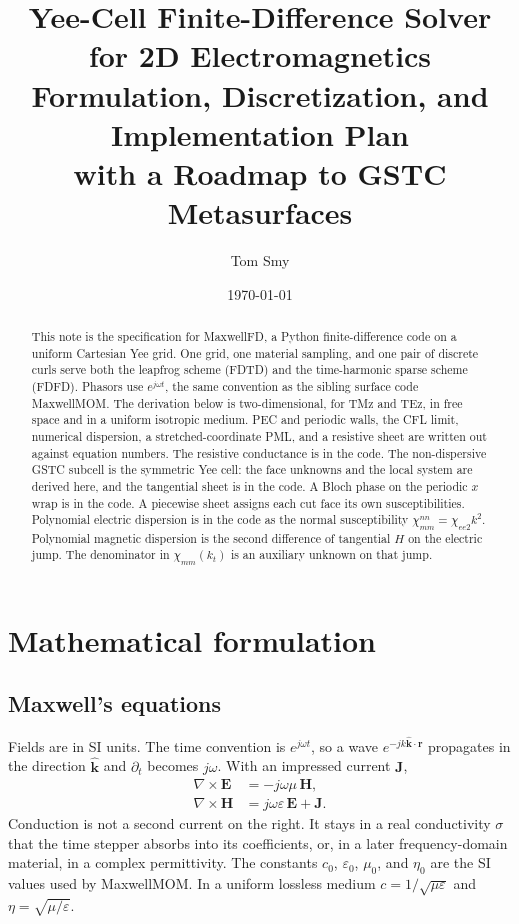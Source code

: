 \documentclass[11pt,a4paper]{article}
\title{\textbf{Yee-Cell Finite-Difference Solver for 2D Electromagnetics}\\[0.4em]
\large Formulation, Discretization, and Implementation Plan\\
with a Roadmap to GSTC Metasurfaces}
\author{Tom Smy}
\date{\today}
\numberwithin{equation}{section}
\begin{document}
\maketitle

\begin{abstract}
This note is the specification for MaxwellFD, a Python finite-difference code
on a uniform Cartesian Yee grid. One grid, one material sampling, and one pair
of discrete curls serve both the leapfrog scheme (FDTD) and the time-harmonic
sparse scheme (FDFD). Phasors use $e^{j\omega t}$, the same convention as the
sibling surface code MaxwellMOM. The derivation below is two-dimensional, for
TMz and TEz, in free space and in a uniform isotropic medium. PEC and periodic
walls, the CFL limit, numerical dispersion, a stretched-coordinate PML, and a
resistive sheet are written out against equation numbers. The resistive
conductance is in the code. The non-dispersive GSTC subcell is the symmetric
Yee cell: the face unknowns and the local system are derived here, and the
tangential sheet is in the code. A Bloch phase on the periodic $x$ wrap
is in the code. A piecewise sheet assigns each cut face its own
susceptibilities. Polynomial electric dispersion is in the code as
the normal susceptibility $\chi_{mm}^{nn}=\chi_{ee2}k^2$. Polynomial
magnetic dispersion is the second difference of tangential $H$ on the
electric jump. The denominator in $\chi_{mm}(k_t)$ is an auxiliary
unknown on that jump.
\end{abstract}

\tableofcontents
\newpage

\section{Mathematical formulation}
\label{sec:formulation}

\subsection{Maxwell's equations}
\label{sec:maxwell}

Fields are in SI units. The time convention is $e^{j\omega t}$, so a wave
$e^{-jk\hat{\mathbf{k}}\cdot\mathbf{r}}$ propagates in the direction
$\hat{\mathbf{k}}$ and $\partial_t$ becomes $j\omega$. With an impressed
current $\mathbf{J}$,
\begin{align}
\nabla\times\mathbf{E} &= -j\omega\mu\,\mathbf{H}, \label{eq:faraday}\\
\nabla\times\mathbf{H} &= j\omega\varepsilon\,\mathbf{E}+\mathbf{J}. \label{eq:ampere}
\end{align}
Conduction is not a second current on the right. It stays in a real
conductivity $\sigma$ that the time stepper absorbs into its coefficients, or,
in a later frequency-domain material, in a complex permittivity. The
constants $c_0$, $\varepsilon_0$, $\mu_0$, and $\eta_0$ are the SI values used
by MaxwellMOM. In a uniform lossless medium $c=1/\sqrt{\mu\varepsilon}$ and
$\eta=\sqrt{\mu/\varepsilon}$.
\end{document}
